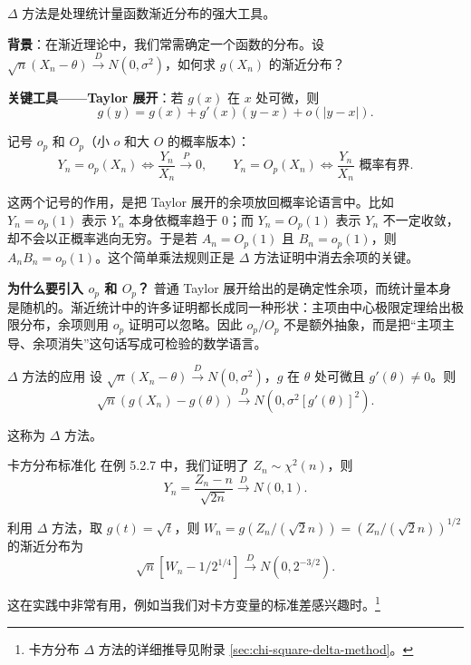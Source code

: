 $\Delta$ 方法是处理统计量函数渐近分布的强大工具。

\textbf{背景}：在渐近理论中，我们常需确定一个函数的分布。设 $\sqrt{n}(X_n - \theta) \xrightarrow{D} N(0, \sigma^2)$，如何求 $g(X_n)$ 的渐近分布？

\textbf{关键工具——Taylor 展开}：若 $g(x)$ 在 $x$ 处可微，则
\[
g(y) = g(x) + g'(x)(y-x) + o(|y-x|).
\label{eq:taylor-expansion}
\]

记号 $o_p$ 和 $O_p$（小 $o$ 和大 $O$ 的概率版本）：
\[
Y_n = o_p(X_n) \iff \frac{Y_n}{X_n} \xrightarrow{P} 0,\qquad
Y_n = O_p(X_n) \iff \frac{Y_n}{X_n} \text{ 概率有界}.
\label{eq:op-notation}
\]

这两个记号的作用，是把 Taylor 展开的余项放回概率论语言中。比如 $Y_n=o_p(1)$ 表示 $Y_n$ 本身依概率趋于 $0$；而 $Y_n=O_p(1)$ 表示 $Y_n$ 不一定收敛，却不会以正概率逃向无穷。于是若 $A_n=O_p(1)$ 且 $B_n=o_p(1)$，则 $A_nB_n=o_p(1)$。这个简单乘法规则正是 $\Delta$ 方法证明中消去余项的关键。

\begin{remark}
\textbf{为什么要引入 $o_p$ 和 $O_p$？} 普通 Taylor 展开给出的是确定性余项，而统计量本身是随机的。渐近统计中的许多证明都长成同一种形状：主项由中心极限定理给出极限分布，余项则用 $o_p$ 证明可以忽略。因此 $o_p/O_p$ 不是额外抽象，而是把``主项主导、余项消失''这句话写成可检验的数学语言。
\end{remark}

\begin{example}{$\Delta$ 方法的应用}\label{ex:delta-method-example}
设 $\sqrt{n}(X_n - \theta) \xrightarrow{D} N(0, \sigma^2)$，$g$ 在 $\theta$ 处可微且 $g'(\theta) \neq 0$。则
\[
\sqrt{n}(g(X_n) - g(\theta)) \xrightarrow{D} N(0, \sigma^2 [g'(\theta)]^2).
\label{eq:delta-method-result}
\]

这称为 $\Delta$ 方法。%
\end{example}

\begin{example}{卡方分布标准化}\label{ex:chi-square-standardized}
在例 5.2.7 中，我们证明了 $Z_n \sim \chi^2(n)$，则
\[
Y_n = \frac{Z_n - n}{\sqrt{2n}} \xrightarrow{D} N(0,1).
\label{eq:chi-square-standardized}
\]

利用 $\Delta$ 方法，取 $g(t) = \sqrt{t}$，则 $W_n = g(Z_n/(\sqrt{2}n)) = (Z_n/(\sqrt{2}n))^{1/2}$ 的渐近分布为
\[
\sqrt{n}[W_n - 1/2^{1/4}] \xrightarrow{D} N(0, 2^{-3/2}).
\label{eq:chi-square-delta-method}
\]

这在实践中非常有用，例如当我们对卡方变量的标准差感兴趣时。\footnote{卡方分布 $\Delta$ 方法的详细推导见附录 \cref{sec:chi-square-delta-method}。}
\end{example}

